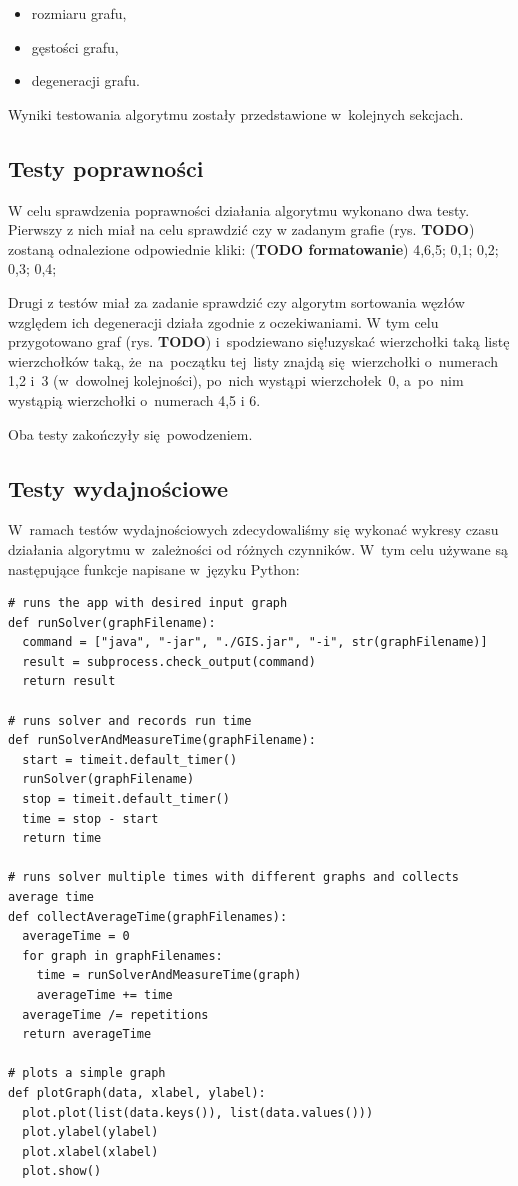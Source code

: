 \documentclass[11pt,a4paper]{article}
\begin{document}
\begin{itemize}
  \item rozmiaru grafu,
  \item gęstości grafu,
  \item degeneracji grafu.
\end{itemize}

Wyniki testowania algorytmu zostały przedstawione w~kolejnych sekcjach.

\subsection{Testy poprawności}
W celu sprawdzenia poprawności działania algorytmu wykonano dwa testy.
Pierwszy z nich miał na celu sprawdzić czy w zadanym grafie (rys. \textbf{TODO})
zostaną odnalezione odpowiednie kliki: (\textbf{TODO formatowanie}) 4,6,5; 0,1; 0,2; 0,3; 0,4;

Drugi z testów miał za zadanie sprawdzić czy algorytm sortowania
węzłów względem ich degeneracji działa zgodnie z oczekiwaniami.
W tym celu przygotowano graf (rys. \textbf{TODO}) i~spodziewano się!uzyskać
wierzchołki taką listę wierzchołków taką, że~na~początku tej~listy
znajdą się~wierzchołki o~numerach 1,2 i~3 (w~dowolnej kolejności), po~nich
wystąpi wierzchołek~0, a~po~nim wystąpią wierzchołki o~numerach 4,5 i 6.

Oba testy zakończyły się~powodzeniem.

\newpage
\subsection{Testy wydajnościowe}
W~ramach testów wydajnościowych zdecydowaliśmy się wykonać wykresy czasu działania algorytmu w~zależności od różnych czynników. W~tym celu używane są następujące funkcje napisane w~języku Python:\\

\begin{lstlisting}[caption = Funkcje pomocnicze dla testów wydajnoćiowych]
# runs the app with desired input graph
def runSolver(graphFilename):
  command = ["java", "-jar", "./GIS.jar", "-i", str(graphFilename)]
  result = subprocess.check_output(command)
  return result

# runs solver and records run time
def runSolverAndMeasureTime(graphFilename):
  start = timeit.default_timer()
  runSolver(graphFilename)
  stop = timeit.default_timer()
  time = stop - start
  return time

# runs solver multiple times with different graphs and collects average time
def collectAverageTime(graphFilenames):
  averageTime = 0
  for graph in graphFilenames:
    time = runSolverAndMeasureTime(graph)
    averageTime += time
  averageTime /= repetitions
  return averageTime

# plots a simple graph
def plotGraph(data, xlabel, ylabel):
  plot.plot(list(data.keys()), list(data.values()))
  plot.ylabel(ylabel)
  plot.xlabel(xlabel)
  plot.show()
\end{lstlisting}
\end{document}
